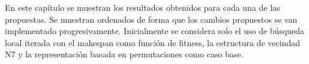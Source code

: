 En este capítulo se muestran los resultados obtenidos para cada una de las propuestas. Se muestran ordenados de forma que los cambios propuestos se van implementado progresivamente. Inicialmente se considera solo el uso de búsqueda local iterada con el makespan como función de fitness, la estructura de vecindad N7 y la representación basada en permutaciones como caso base.
